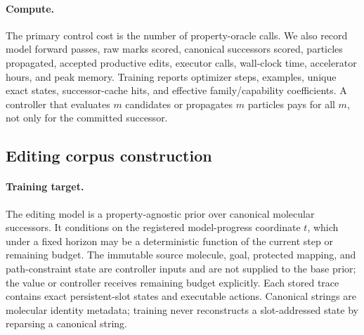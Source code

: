 \paragraph{Compute.}
The primary control cost is the number of property-oracle calls.  We also
record model forward passes, raw marks scored, canonical successors scored,
particles propagated, accepted productive edits, executor calls, wall-clock
time, accelerator hours, and peak memory.  Training reports optimizer steps,
examples, unique exact states, successor-cache hits, and effective
family/capability coefficients.  A controller that evaluates $m$ candidates or
propagates $m$ particles pays for all $m$, not only for the committed
successor.

\subsection{Editing corpus construction}
\label{app:editing-corpus}

\paragraph{Training target.}
The editing model is a property-agnostic prior over canonical molecular
successors. It conditions on the registered model-progress coordinate $t$,
which under a fixed horizon may be a deterministic function of the current
step or remaining budget. The immutable source molecule, goal, protected
mapping, and path-constraint state are controller inputs and are not supplied
to the base prior; the value or controller receives remaining budget explicitly.
Each stored trace contains exact persistent-slot states and executable actions.
Canonical strings are molecular identity metadata; training never reconstructs
a slot-addressed state by reparsing a canonical string.

